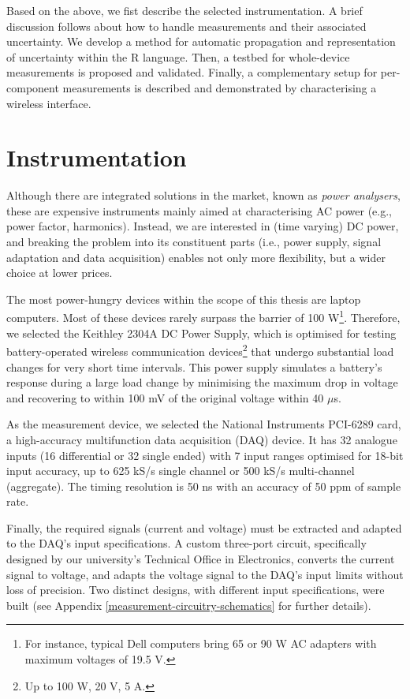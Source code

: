 \documentclass[twoside,nohyper]{tufte-book}
\theoremstyle{definition}
\theoremstyle{definition}
\theoremstyle{definition}
\theoremstyle{remark}
\begin{document}
Based on the above, we fist describe the selected instrumentation. A
brief discussion follows about how to handle measurements and their
associated uncertainty. We develop a method for automatic propagation
and representation of uncertainty within the R
language\cite[0pt]{R-base}.
Then, a testbed for whole-device measurements is proposed and validated.
Finally, a complementary setup for per-component measurements is
described and demonstrated by characterising a wireless interface.

\section{Instrumentation}\label{instrumentation}

Although there are integrated solutions in the market, known as
\emph{power analysers}, these are expensive instruments mainly aimed at
characterising AC power (e.g., power factor, harmonics). Instead, we are
interested in (time varying) DC power, and breaking the problem into its
constituent parts (i.e., power supply, signal adaptation and data
acquisition) enables not only more flexibility, but a wider choice at
lower prices.

The most power-hungry devices within the scope of this thesis are laptop
computers. Most of these devices rarely surpass the barrier of 100
W\footnote{For instance, typical Dell computers bring 65 or 90 W AC
  adapters with maximum voltages of 19.5 V.}. Therefore, we selected the
Keithley 2304A DC Power Supply, which is optimised for testing
battery-operated wireless communication devices\footnote{Up to 100 W, 20
  V, 5 A.} that undergo substantial load changes for very short time
intervals. This power supply simulates a battery's response during a
large load change by minimising the maximum drop in voltage and
recovering to within 100 mV of the original voltage within 40 \(\mu\)s.

As the measurement device, we selected the National Instruments PCI-6289
card, a high-accuracy multifunction data acquisition (DAQ) device. It
has 32 analogue inputs (16 differential or 32 single ended) with 7 input
ranges optimised for 18-bit input accuracy, up to 625 kS/s single
channel or 500 kS/s multi-channel (aggregate). The timing resolution is
50 ns with an accuracy of 50 ppm of sample rate.

Finally, the required signals (current and voltage) must be extracted
and adapted to the DAQ's input specifications. A custom three-port
circuit, specifically designed by our university's Technical Office in
Electronics, converts the current signal to voltage, and adapts the
voltage signal to the DAQ's input limits without loss of precision. Two
distinct designs, with different input specifications, were built (see
Appendix \ref{measurement-circuitry-schematics} for further details).
\end{document}
